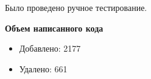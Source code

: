 Было проведено ручное тестирование.

\textbf{Объем написанного кода}

\begin{itemize}
  \item Добавлено: 2177
  \item Удалено: 661
\end{itemize}
